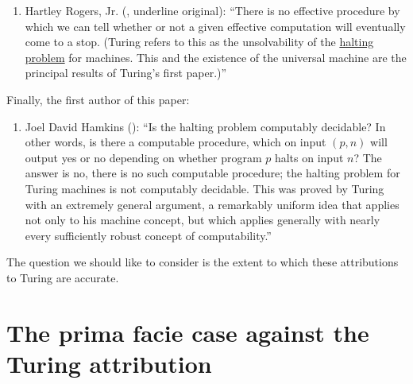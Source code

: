 \documentclass[12pt]{amsart}
\begin{document}
\begin{enumerate}
 \bigskip 

    \item Hartley Rogers, Jr. (\cite[p. 19]{rogers1987theory}, underline original): \enquote{There is no effective procedure by which we can tell whether or not a given effective computation will eventually come to a stop. (Turing refers to this as the unsolvability of the \underline{halting problem} for machines. This and the existence of the universal machine are the principal results of Turing's first paper.)}

\end{enumerate}

\bigskip

\noindent Finally, the first author of this paper:

\bigskip

\begin{enumerate}[resume]\small
    \item  Joel David Hamkins (\cite[\S6.5]{Hamkins2021:Lectures-on-the-philosophy-of-mathematics}): ``Is the halting problem computably decidable? In other words, is there a computable procedure, which on input $(p,n)$ will output yes or no depending on whether program $p$ halts on input $n$? The answer is no, there is no such computable procedure; the halting problem for Turing machines is not computably decidable. This was proved by Turing with an extremely general argument, a remarkably uniform idea that applies not only to his machine concept, but which applies generally with nearly every sufficiently robust concept of computability.''

\end{enumerate}
The question we should like to consider is the extent to which these attributions to Turing are accurate. 

\section{The prima facie case against the Turing attribution}
\end{document}
